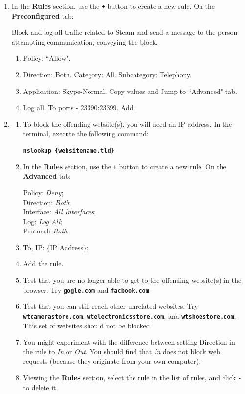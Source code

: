 \documentclass[12pt]{extarticle}
\newcommand{\ben}{\begin{enumerate}}
\newcommand{\een}{\end{enumerate}}
\begin{document}
\begin{enumerate}
\item In the \textbf{Rules} section, use the \texttt{+} button to create a new rule. On the \textbf{Preconfigured} tab:

Block and log all traffic related to Steam and send a message to the person attempting communication, conveying the block.
    \ben
        \item Policy: ``Allow".  
        \item Direction: Both. Category: All. Subcategory: Telephony.
        \item Application: Skype-Normal. Copy values and Jump to ``Advanced" tab.
        \item Log all. To ports - 23390:23399. Add.
    \een

\item 
    \ben
        \item To block the offending website(s), you will need an IP address. In the terminal, execute the following command:
        
        \texttt{\textbf{nslookup \{websitename.tld\}}}
        
        \item In the \textbf{Rules} section, use the \texttt{+} button to create a new rule. On the \textbf{Advanced} tab:
        
        Policy: \textit{Deny}; \\Direction: \textit{Both}; \\Interface: \textit{All Interfaces}; \\Log: \textit{Log All}; \\Protocol: \textit{Both}.
        
        \item To, IP: \{IP Address\};
        
        \item Add the rule.
        
        \item Test that you are no longer able to get to the offending website(s) in the browser. Try \texttt{\textbf{gogle.com}} and \texttt{\textbf{facbook.com}}
        
        \item Test that you can still reach other unrelated websites. Try \texttt{\textbf{wtcamerastore.com}}, \texttt{\textbf{wtelectronicsstore.com}}, and \texttt{\textbf{wtshoestore.com}}. This set of websites should not be blocked.
        
        \item You might experiment with the difference between setting Direction in the rule to \textit{In} or \textit{Out}. You should find that \textit{In} does not block web requests (because they originate from your own computer).
        
        \item Viewing the \textbf{Rules} section, select the rule in the list of rules, and click \texttt{-} to delete it.
    \een
    
\end{enumerate}
\end{document}
